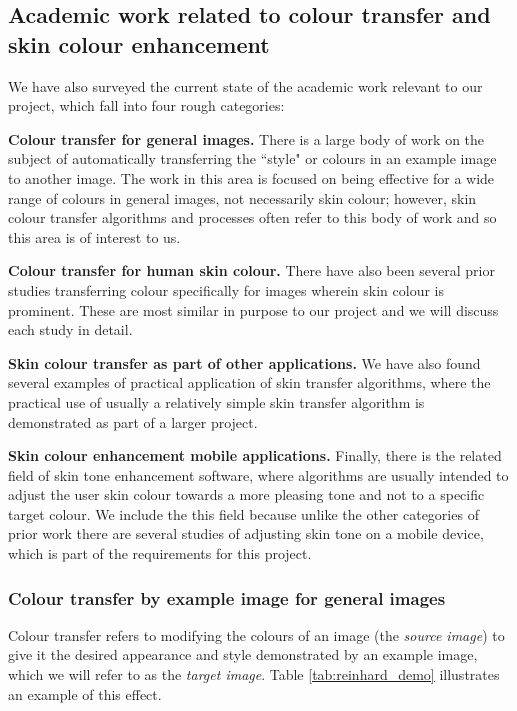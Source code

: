 

\subsection{Academic work related to colour transfer and skin colour enhancement \label{sec:academic_work}}

We have also surveyed the current state of the academic work relevant to our project, which fall into four rough categories:

\textbf{Colour transfer for general images.} There is a large body of work on the subject of automatically transferring the ``style" or colours in an example image to another image. The work in this area is focused on being effective for a wide range of colours in general images, not necessarily skin colour; however, skin colour transfer algorithms and processes often refer to this body of work and so this area is of interest to us.

\textbf{Colour transfer for human skin colour.} There have also been several prior studies transferring colour specifically for images wherein skin colour is prominent. These are most similar in purpose to our project and we will discuss each study in detail.

\textbf{Skin colour transfer as part of other applications.} We have also found several examples of practical application of skin transfer algorithms, where the practical use of usually a relatively simple skin transfer algorithm is demonstrated as part of a larger project. 

\textbf{Skin colour enhancement mobile applications.} Finally, there is the related field of skin tone enhancement software, where algorithms are usually intended to adjust the user skin colour towards a more pleasing tone and not to a specific target colour. We include the this field because unlike the other categories of prior work there are several studies of adjusting skin tone on a mobile device, which is part of the requirements for this project.

\subsubsection{Colour transfer by example image for general images}
Colour transfer refers to modifying the colours of an image (the \textit{source image}) to give it the desired appearance and style demonstrated by an example image, which we will refer to as the \textit{target image}. Table \ref{tab:reinhard_demo} illustrates an example of this effect.

